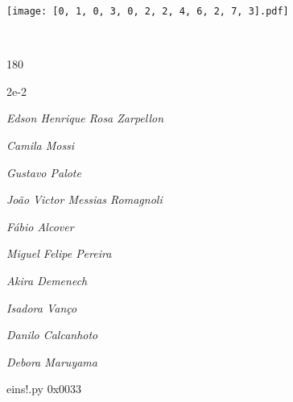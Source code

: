 \documentclass[12pt]{article}
\begin{document}
\texttt{[image: [0, 1, 0, 3, 0, 2, 2, 4, 6, 2, 7, 3].pdf]}


	\hfill	  	  


\pagebreak			

	\ 
	\vfill
	\begin{turn}{180}	
		\begin{minipage}{\textwidth}
		  	\ttfamily %
			\centering
			{\Huge 2e-2}
		  
			\hfill
		  
			

\textit{\small Edson Henrique Rosa Zarpellon}

\textit{\small Camila Mossi}

\textit{\small Gustavo Palote}

\textit{\small João Victor Messias Romagnoli}

\textit{\small Fábio Alcover}

\textit{\small Miguel Felipe Pereira}

\textit{\small Akira Demenech}

\textit{\small Isadora Vanço}

\textit{\small Danilo Calcanhoto}

\textit{\small Debora Maruyama}

\bigskip

eins!.py
0x0033


		\end{minipage}	
	\end{turn}
	\vfill
	\

\pagebreak
\end{document}
